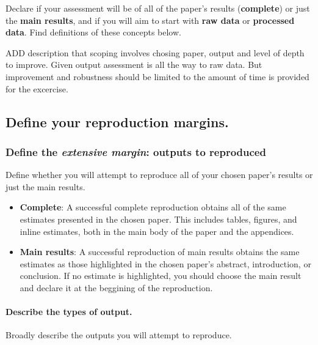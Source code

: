 \documentclass[]{book}
\let\oldparagraph\paragraph
\renewcommand{\paragraph}[1]{\oldparagraph{#1}\mbox{}}
\begin{document}
Declare if your assessment will be of all of the paper's results (\textbf{complete}) or just the \textbf{main results}, and if you will aim to start with \textbf{raw data} or \textbf{processed data}. Find definitions of these concepts below.

ADD description that scoping involves chosing paper, output and level of depth to improve. Given output assessment is all the way to raw data. But improvement and robustness should be limited to the amount of time is provided for the excercise.

\hypertarget{define-your-reproduction-margins.}{%
\subsection{Define your reproduction margins.}\label{define-your-reproduction-margins.}}

\hypertarget{outputs}{%
\subsubsection{\texorpdfstring{Define the \emph{extensive margin}: outputs to reproduced}{Define the extensive margin: outputs to reproduced}}\label{outputs}}

Define whether you will attempt to reproduce all of your chosen paper's results or just the main results.

\begin{itemize}
\item
  \textbf{Complete}: A successful complete reproduction obtains all of the same estimates presented in the chosen paper. This includes tables, figures, and inline estimates, both in the main body of the paper and the appendices.
\item
  \textbf{Main results}: A successful reproduction of main results obtains the same estimates as those highlighted in the chosen paper's abstract, introduction, or conclusion. If no estimate is highlighted, you should choose the main result and declare it at the beggining of the reproduction.
\end{itemize}

\hypertarget{describe-the-types-of-output.}{%
\paragraph{Describe the types of output.}\label{describe-the-types-of-output.}}

Broadly describe the outputs you will attempt to reproduce.
\end{document}
